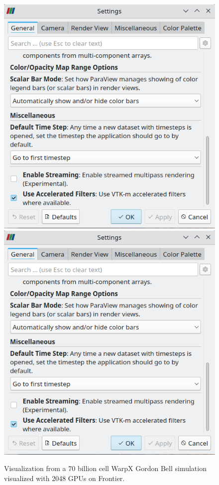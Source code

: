 \begin{figure}[htb]
  \includegraphics[width=\linewidth]{figures/paraview-settings.png}
  \includegraphics[width=\linewidth]{figures/paraview-settings.png}
  \caption{Visualization from a 70 billion cell WarpX Gordon Bell simulation visualized with 2048 GPUs on Frontier.}
  \label{fig:visit_warpx_frontier}
\end{figure}

